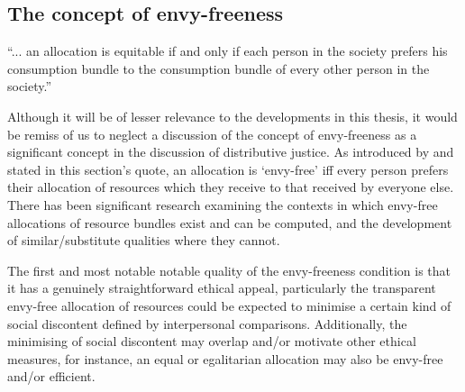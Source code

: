 \subsection{The concept of envy-freeness}\label{sec:envy_free_philosophy}

\begin{displayquote}
``... an allocation is equitable if and only if each person in the society prefers his consumption bundle to the consumption bundle of every other person in the society.'' \cite[Chapter 4]{foley_thesis}
\end{displayquote}

Although it will be of lesser relevance to the developments in this thesis, it would be remiss of us to neglect a discussion of the concept of envy-freeness as a significant concept in the discussion of distributive justice.
As introduced by \cite{foley_thesis} and stated in this section's quote, an allocation is `envy-free' iff every person prefers their allocation of resources which they receive to that received by everyone else.
There has been significant research examining the contexts in which envy-free allocations of resource bundles exist and can be computed, and the development of similar/substitute qualities where they cannot.

The first and most notable notable quality of the envy-freeness condition is that it has a genuinely straightforward ethical appeal, particularly the transparent envy-free allocation of resources could be expected to minimise a certain kind of social discontent defined by interpersonal comparisons.
Additionally, the minimising of social discontent may overlap and/or motivate other ethical measures, for instance, an equal or egalitarian allocation may also be envy-free and/or efficient.


